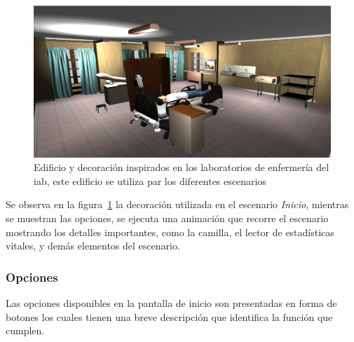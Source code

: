 \begin{figure}[H] 
\centering 
\includegraphics[scale=0.2]{propuesta/sala.jpg}
\caption{Edificio y decoración inspirados en los laboratorios de enfermería del
    \Gls{iab}, este edificio se utiliza par los diferentes escenarios}
\label{fig:sala_perspectiva}
\end{figure}

Se observa en la figura~\ref{fig:sala_perspectiva} la decoración utilizada en
el escenario \emph{Inicio}, mientras se muestran las opciones, se ejecuta una
animación que recorre el escenario mostrando los detalles importantes, como la
camilla, el lector de estadísticas vitales, y demás elementos del escenario.

\subsubsection{Opciones}

Las opciones disponibles en la pantalla de inicio son presentadas en forma de
botones los cuales tienen una breve descripción que identifica la función que
cumplen. 

